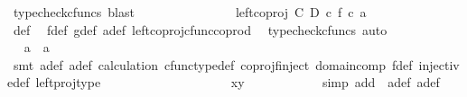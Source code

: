 \begin{isabellebody}
\ {\isacharparenleft}{\kern0pt}typecheck{\isacharunderscore}{\kern0pt}cfuncs{\isacharcomma}{\kern0pt}\ blast{\isacharparenright}{\kern0pt}\isanewline
\ \ \ \ \ \ \ \ \ \ \isamarkupfalse%
\ \isamarkupfalse%
\ {\isachardoublequoteopen}{\isachardot}{\kern0pt}{\isachardot}{\kern0pt}{\isachardot}{\kern0pt}\ {\isacharequal}{\kern0pt}\ {\isacharparenleft}{\kern0pt}left{\isacharunderscore}{\kern0pt}coproj\ C\ D\ {\isasymcirc}\isactrlsub c\ f{\isacharparenright}{\kern0pt}\ {\isasymcirc}\isactrlsub c\ a{\isacharprime}{\kern0pt}{\isachardoublequoteclose}\isanewline
\ \ \ \ \ \ \ \ \ \ \ \ \isamarkupfalse%
\ {\isasymphi}{\isacharunderscore}{\kern0pt}def\ \isamarkupfalse%
\ f{\isacharunderscore}{\kern0pt}def\ g{\isacharunderscore}{\kern0pt}def\ a{\isacharprime}{\kern0pt}{\isacharunderscore}{\kern0pt}def\ left{\isacharunderscore}{\kern0pt}coproj{\isacharunderscore}{\kern0pt}cfunc{\isacharunderscore}{\kern0pt}coprod\ \isamarkupfalse%
\ {\isacharparenleft}{\kern0pt}typecheck{\isacharunderscore}{\kern0pt}cfuncs{\isacharcomma}{\kern0pt}\ auto{\isacharparenright}{\kern0pt}\isanewline
\ \ \ \ \ \ \ \ \ \ \isamarkupfalse%
\ \isamarkupfalse%
\ {\isachardoublequoteopen}a\ {\isacharequal}{\kern0pt}\ a{\isacharprime}{\kern0pt}{\isachardoublequoteclose}\isanewline
\ \ \ \ \ \ \ \ \ \ \ \ \isamarkupfalse%
\ {\isacharparenleft}{\kern0pt}smt\ a{\isacharprime}{\kern0pt}{\isacharunderscore}{\kern0pt}def\ a{\isacharunderscore}{\kern0pt}def\ calculation\ cfunc{\isacharunderscore}{\kern0pt}type{\isacharunderscore}{\kern0pt}def\ coproj{\isacharunderscore}{\kern0pt}f{\isacharunderscore}{\kern0pt}inject\ domain{\isacharunderscore}{\kern0pt}comp\ f{\isacharunderscore}{\kern0pt}def\ injective{\isacharunderscore}{\kern0pt}def\ left{\isacharunderscore}{\kern0pt}proj{\isacharunderscore}{\kern0pt}type{\isacharparenright}{\kern0pt}\isanewline
\ \ \ \ \ \ \ \ \isamarkupfalse%
\isanewline
\ \ \ \ \ \ \ \ \isamarkupfalse%
\ \isamarkupfalse%
\ {\isachardoublequoteopen}x{\isacharequal}{\kern0pt}y{\isachardoublequoteclose}\isanewline
\ \ \ \ \ \ \ \ \ \ \isamarkupfalse%
\ {\isacharparenleft}{\kern0pt}simp\ add{\isacharcolon}{\kern0pt}\ \ a{\isacharprime}{\kern0pt}{\isacharunderscore}{\kern0pt}def{\isacharparenleft}{\kern0pt}{}{\isacharparenright}{\kern0pt}\ a{\isacharunderscore}{\kern0pt}def{\isacharparenleft}{\kern0pt}{}{\isacharparenright}{\kern0pt}{\isacharparenright}{\kern0pt}\isanewline

\end{isabellebody}
